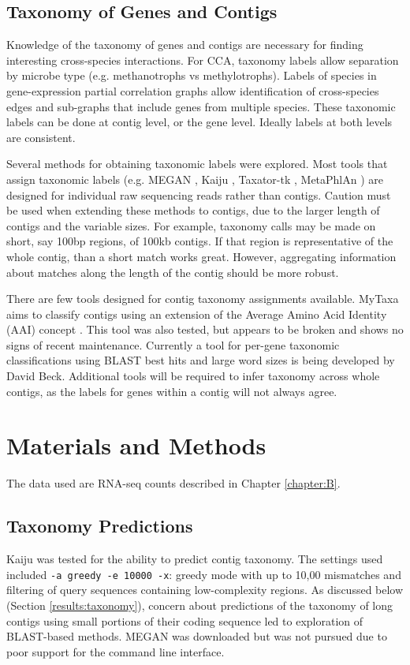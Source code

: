 \subsection{Taxonomy of Genes and Contigs}
Knowledge of the taxonomy of genes and contigs are necessary for finding interesting cross-species interactions.
For CCA, taxonomy labels allow separation by microbe type (e.g. methanotrophs vs methylotrophs).
Labels of species in gene-expression partial correlation graphs allow identification of cross-species edges and sub-graphs that include genes from multiple species.
These taxonomic labels can be done at contig level, or the gene level.
Ideally labels at both levels are consistent.

Several methods for obtaining taxonomic labels were explored.
Most tools that assign taxonomic labels (e.g. MEGAN \cite{huson2015}, Kaiju \cite{menzel2016}, Taxator-tk \cite{droge2014}, MetaPhlAn \cite{segata2012}) are designed for individual raw sequencing reads rather than contigs.
Caution must be used when extending these methods to contigs, due to the larger length of contigs and the variable sizes.
For example, taxonomy calls may be made on short, say 100bp regions, of 100kb contigs.
If that region is representative of the whole contig, than a short match works great.
However, aggregating information about matches along the length of the contig should be more robust.

There are few tools designed for contig taxonomy assignments available.
MyTaxa aims to classify contigs using an extension of the Average Amino Acid Identity (AAI) concept \cite{konstantinidis2005}.
This tool was also tested, but appears to be broken and shows no signs of recent maintenance.
Currently a tool for per-gene taxonomic classifications using BLAST best hits and large word sizes is being developed by David Beck.
Additional tools will be required to infer taxonomy across whole contigs, as the labels for genes within a contig will not always agree.


\section{Materials and Methods}

The data used are RNA-seq counts described in Chapter \ref{chapter:B}.

\subsection{Taxonomy Predictions}
Kaiju \cite{menzel2016} was tested for the ability to predict contig taxonomy.
The settings used included \texttt{-a greedy -e 10000 -x}: greedy mode with up to 10,00 mismatches and filtering of query sequences containing low-complexity regions.
As discussed below (Section \ref{results:taxonomy}), concern about predictions of the taxonomy of long contigs using small portions of their coding sequence led to exploration of BLAST-based methods.
MEGAN was downloaded but was not pursued due to poor support for the command line interface.

